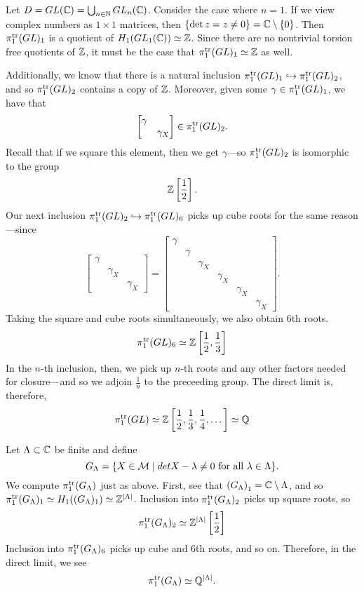 \begin{example}
  Let \(D = GL(\mathbb{C}) = \bigcup_{n \in \mathbb{N}} GL_n(\mathbb{C})\). Consider the case where \(n =1\).
  If we view complex numbers as \(1\times 1\) matrices, then
  \(\{\det z = z \neq 0\} = \mathbb{C} \setminus \{0\} \). Then
  \(\pi_1^{\operatorname{tr}}(GL)_1\) is a quotient of \(H_1(GL_1(\mathbb{C}))\simeq \mathbb{Z} \).
  Since there are no nontrivial torsion free quotients of \(\mathbb{Z} \), it must be the case
  that \(\pi_1^{\operatorname{tr}}(GL)_1\simeq\mathbb{Z} \) as well.

  Additionally, we know that there is a natural inclusion
  \(\pi_1^{\operatorname{tr}}(GL)_1 \hookrightarrow \pi_1^{\operatorname{tr}}(GL)_2\), and so
  \(\pi_1^{\operatorname{tr}}(GL)_2\) contains a copy of \(\mathbb{Z} \). Moreover, given some
  \(\gamma \in \pi_1^{\operatorname{tr}}(GL)_1\), we have that
  \[
    \begin{bmatrix} \gamma&\\&\gamma_X \end{bmatrix} \in \pi_1^{\operatorname{tr}}(GL)_2.
  \]
  Recall that if we square this element, then we get \(\gamma\)---so
  \(\pi_1^{\operatorname{tr}}(GL)_2\) is isomorphic to the group
  \[
    \mathbb{Z} \left[\frac{1}{2}\right].
  \]
  Our next inclusion
  \(\pi_1^{\operatorname{tr}}(GL)_2\hookrightarrow \pi_1^{\operatorname{tr}}(GL)_6\) picks up cube roots for
  the same reason---since
  \[
    \begin{bmatrix} \gamma\\&\gamma_X\\&& \gamma_X  \end{bmatrix} =
    \begin{bmatrix} \gamma\\&\gamma\\&&\gamma_X\\&&&\gamma_X\\&&&&\gamma_X\\&&&&&\gamma_X  \end{bmatrix}.
  \]
  Taking the square and cube roots simultaneously, we also obtain 6th roots.
  \[
    \pi_1^{\operatorname{tr}}(GL)_6 \simeq \mathbb{Z} \left[\frac{1}{2}, \frac{1}{3}\right]
  \]
  In the \(n\)-th inclusion, then, we pick up \(n\)-th roots and any other
  factors needed for closure---and so we adjoin \(\frac{1}{n}\) to the
  preceeding group.
  The direct limit is, therefore,
  \[
    \pi_1^{\operatorname{tr}}(GL) \simeq \mathbb{Z} \left[\frac{1}{2},\frac{1}{3},\frac{1}{4}, \dots\right]\simeq \mathbb{Q}
  \]
\end{example}

\begin{example}
  Let \(\Lambda \subset \mathbb{C} \) be finite and define
  \[
    G_\Lambda = \{ X \in \mathcal{M} \mid det X - \lambda \neq 0 \textrm{ for all
    } \lambda \in \Lambda\}.
  \]
  We compute \(\pi_1^{\operatorname{tr}}(G_\Lambda)\) just as above. First, see that
  \( \left( G_\Lambda \right) _1 = \mathbb{C} \setminus \Lambda\), and so
  \(\pi_1^{\operatorname{tr}}(G_\Lambda)_1\simeq H_1((G_\Lambda)_1)\simeq \mathbb{Z}^{|\Lambda|}\).
  Inclusion into \(\pi_1^{\operatorname{tr}}(G_\Lambda)_2\) picks up square roots, so
  \[
    \pi_1^{\operatorname{tr}}(G_\Lambda)_2 \simeq \mathbb{Z}^{|\Lambda|}\left[ \frac{1}{2} \right]
  \]
  Inclusion into \(\pi_1^{\operatorname{tr}}(G_\Lambda)_6\) picks up cube and 6th roots, and so
  on. Therefore, in the direct limit, we see
  \[
    \pi_1^{\operatorname{tr}}(G_\Lambda) \simeq \mathbb{Q} ^{|\Lambda|}.
  \]
\end{example}
